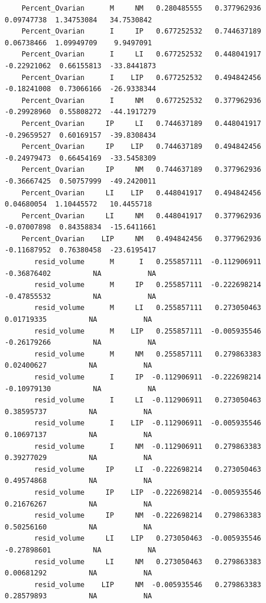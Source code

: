 \documentclass[
  landscape]{article}
\begin{document}
\begin{verbatim}
    Percent_Ovarian      M     NM   0.280485555   0.377962936    0.09747738  1.34753084   34.7530842
    Percent_Ovarian      I     IP   0.677252532   0.744637189    0.06738466  1.09949709    9.9497091
    Percent_Ovarian      I     LI   0.677252532   0.448041917   -0.22921062  0.66155813  -33.8441873
    Percent_Ovarian      I    LIP   0.677252532   0.494842456   -0.18241008  0.73066166  -26.9338344
    Percent_Ovarian      I     NM   0.677252532   0.377962936   -0.29928960  0.55808272  -44.1917279
    Percent_Ovarian     IP     LI   0.744637189   0.448041917   -0.29659527  0.60169157  -39.8308434
    Percent_Ovarian     IP    LIP   0.744637189   0.494842456   -0.24979473  0.66454169  -33.5458309
    Percent_Ovarian     IP     NM   0.744637189   0.377962936   -0.36667425  0.50757999  -49.2420011
    Percent_Ovarian     LI    LIP   0.448041917   0.494842456    0.04680054  1.10445572   10.4455718
    Percent_Ovarian     LI     NM   0.448041917   0.377962936   -0.07007898  0.84358834  -15.6411661
    Percent_Ovarian    LIP     NM   0.494842456   0.377962936   -0.11687952  0.76380458  -23.6195417
       resid_volume      M      I   0.255857111  -0.112906911   -0.36876402          NA           NA
       resid_volume      M     IP   0.255857111  -0.222698214   -0.47855532          NA           NA
       resid_volume      M     LI   0.255857111   0.273050463    0.01719335          NA           NA
       resid_volume      M    LIP   0.255857111  -0.005935546   -0.26179266          NA           NA
       resid_volume      M     NM   0.255857111   0.279863383    0.02400627          NA           NA
       resid_volume      I     IP  -0.112906911  -0.222698214   -0.10979130          NA           NA
       resid_volume      I     LI  -0.112906911   0.273050463    0.38595737          NA           NA
       resid_volume      I    LIP  -0.112906911  -0.005935546    0.10697137          NA           NA
       resid_volume      I     NM  -0.112906911   0.279863383    0.39277029          NA           NA
       resid_volume     IP     LI  -0.222698214   0.273050463    0.49574868          NA           NA
       resid_volume     IP    LIP  -0.222698214  -0.005935546    0.21676267          NA           NA
       resid_volume     IP     NM  -0.222698214   0.279863383    0.50256160          NA           NA
       resid_volume     LI    LIP   0.273050463  -0.005935546   -0.27898601          NA           NA
       resid_volume     LI     NM   0.273050463   0.279863383    0.00681292          NA           NA
       resid_volume    LIP     NM  -0.005935546   0.279863383    0.28579893          NA           NA
\end{verbatim}
\end{document}
